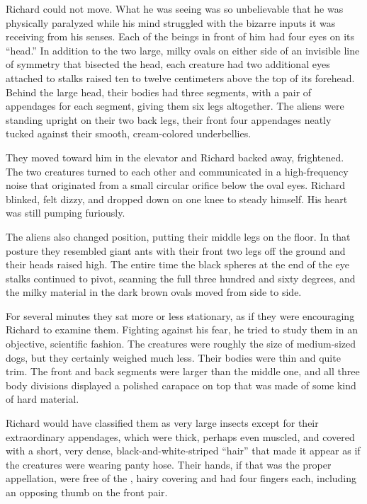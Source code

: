 \documentclass[]{article}
\begin{document}
{Richard could not move. What he was seeing was so unbelievable that he was physically paralyzed while his mind struggled with the bizarre inputs it was receiving from his senses. Each of the beings in front of him had four eyes on its “head.” In addition to the two large, milky ovals on either side of an invisible line of symmetry that bisected the head, each creature had two additional eyes attached to stalks raised ten to twelve centimeters above the top of its forehead. Behind the large head, their bodies had three segments, with a pair of appendages for each segment, giving them six legs altogether. The aliens were standing upright on their two back legs, their front four appendages neatly tucked against their smooth, cream-colored underbellies.

They moved toward him in the elevator and Richard backed away, frightened. The two creatures turned to each other and communicated in a high-frequency noise that originated from a small circular orifice below the oval eyes. Richard blinked, felt dizzy, and dropped down on one knee to steady himself. His heart was still pumping furiously.

The aliens also changed position, putting their middle legs on the floor. In that posture they resembled giant ants with their front two legs off the ground and their heads raised high. The entire time the black spheres at the end of the eye stalks continued to pivot, scanning the full three hundred and sixty degrees, and the milky material in the dark brown ovals moved from side to side.

For several minutes they sat more or less stationary, as if they were encouraging Richard to examine them. Fighting against his fear, he tried to study them in an objective, scientific fashion. The creatures were roughly the size of medium-sized dogs, but they certainly weighed much less. Their bodies were thin and quite trim. The front and back segments were larger than the middle one, and all three body divisions displayed a polished carapace on top that was made of some kind of hard material.

Richard would have classified them as very large insects except for their extraordinary appendages, which were thick, perhaps even muscled, and covered with a short, very dense, black-and-white-striped “hair” that made it appear as if the creatures were wearing panty hose. Their hands, if that was the proper appellation, were free of the , hairy covering and had four fingers each, including an opposing thumb on the front pair.

}
\end{document}
